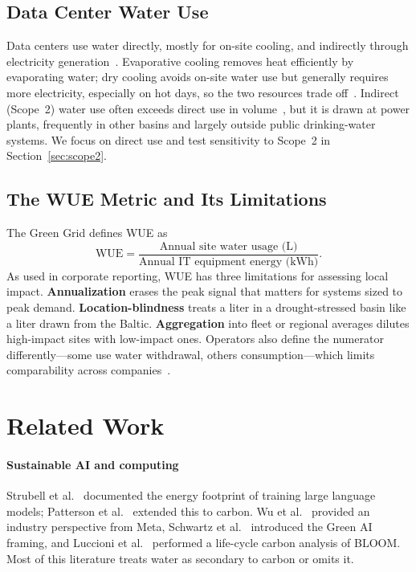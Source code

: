 \documentclass[conference,10pt]{IEEEtran}
\begin{document}
\subsection{Data Center Water Use}

Data centers use water directly, mostly for on-site cooling, and indirectly
through electricity generation~\cite{li2023thirsty, han2026}. Evaporative
cooling removes heat efficiently by evaporating water; dry cooling avoids
on-site water use but generally requires more electricity, especially on hot
days, so the two resources trade off~\cite{karimi2022water, han2026}.
Indirect (Scope~2) water use often exceeds direct use in
volume~\cite{li2023thirsty}, but it is drawn at power plants, frequently in
other basins and largely outside public drinking-water systems. We focus on
direct use and test sensitivity to Scope~2 in Section~\ref{sec:scope2}.

\subsection{The WUE Metric and Its Limitations}

The Green Grid defines WUE as~\cite{greengrid2011wue}
\begin{equation}
\textrm{WUE} = \frac{\textrm{Annual site water usage (L)}}
                    {\textrm{Annual IT equipment energy (kWh)}}.
\label{eq:wue}
\end{equation}
As used in corporate reporting, WUE has three limitations for assessing
local impact. \textbf{Annualization} erases the peak signal that matters for
systems sized to peak demand. \textbf{Location-blindness} treats a liter in
a drought-stressed basin like a liter drawn from the Baltic.
\textbf{Aggregation} into fleet or regional averages dilutes high-impact
sites with low-impact ones. Operators also define the numerator
differently---some use water withdrawal, others consumption---which limits
comparability across companies~\cite{meta2025edi}.

\section{Related Work}
\label{sec:related}

\paragraph{Sustainable AI and computing}
Strubell et al.~\cite{strubell2019energy} documented the energy footprint of
training large language models; Patterson et al.~\cite{patterson2022carbon}
extended this to carbon. Wu et al.~\cite{wu2022sustainable} provided an
industry perspective from Meta, Schwartz et al.~\cite{schwartz2020green}
introduced the Green AI framing, and Luccioni et
al.~\cite{luccioni2023bloom} performed a life-cycle carbon analysis of
BLOOM. Most of this literature treats water as secondary to carbon or omits
it.
\end{document}
